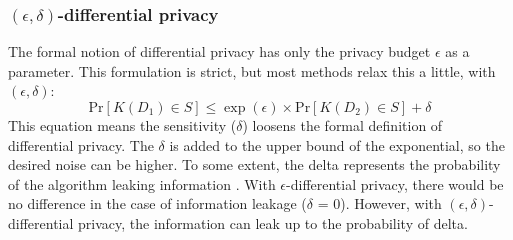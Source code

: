 \subsubsection{$(\epsilon, \delta)$-differential privacy}
The formal notion of differential privacy has only the privacy budget $\epsilon$ as a parameter.
This formulation is strict, but most methods relax this a little, with $(\epsilon, \delta)$:
\begin{equation}
  {\mathrm{Pr}}[K(D_{1})\in S]\leq\exp(\epsilon)\times{\mathrm{Pr}}[K(D_{2})\in S] + \delta
  \label{approxiate-dp}
\end{equation}
This equation means the sensitivity ($\delta$) loosens the formal definition of differential privacy.
The $\delta$ is added to the upper bound of the exponential, so the desired noise can be higher.
To some extent, the delta represents the probability of the algorithm leaking information \citep{aitsam_differential_2021}.
With $\epsilon$-differential privacy, there would be no difference in the case of information leakage ($\delta$ = 0).
However, with $(\epsilon, \delta)$-differential privacy, the information can leak up to the probability of delta.
\newpage
